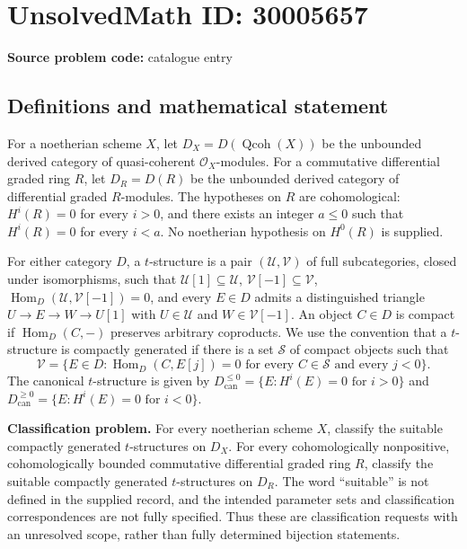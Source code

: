 \documentclass[11pt]{article}
\begin{document}
\section*{UnsolvedMath ID: 30005657}
\textbf{Source problem code:} catalogue entry
\subsection{Definitions and mathematical statement}
For a noetherian scheme \(X\), let \(D_X=D(\operatorname{Qcoh}(X))\) be the unbounded derived category of quasi-coherent \(\mathcal O_X\)-modules. For a commutative differential graded ring \(R\), let \(D_R=D(R)\) be the unbounded derived category of differential graded \(R\)-modules. The hypotheses on \(R\) are cohomological: \(H^i(R)=0\) for every \(i>0\), and there exists an integer \(a\leq 0\) such that \(H^i(R)=0\) for every \(i<a\). No noetherian hypothesis on \(H^0(R)\) is supplied.

For either category \(D\), a \(t\)-structure is a pair \((\mathcal U,\mathcal V)\) of full subcategories, closed under isomorphisms, such that \(\mathcal U[1]\subseteq\mathcal U\), \(\mathcal V[-1]\subseteq\mathcal V\), \(\operatorname{Hom}_D(\mathcal U,\mathcal V[-1])=0\), and every \(E\in D\) admits a distinguished triangle \(U\longrightarrow E\longrightarrow W\longrightarrow U[1]\) with \(U\in\mathcal U\) and \(W\in\mathcal V[-1]\). An object \(C\in D\) is compact if \(\operatorname{Hom}_D(C,-)\) preserves arbitrary coproducts. We use the convention that a \(t\)-structure is compactly generated if there is a set \(\mathcal S\) of compact objects such that
\[
\mathcal V=\{E\in D:\operatorname{Hom}_D(C,E[j])=0\text{ for every }C\in\mathcal S\text{ and every }j<0\}.
\]
The canonical \(t\)-structure is given by \(D_{\mathrm{can}}^{\leq 0}=\{E:H^i(E)=0\text{ for }i>0\}\) and \(D_{\mathrm{can}}^{\geq 0}=\{E:H^i(E)=0\text{ for }i<0\}\).

\textbf{Classification problem.} For every noetherian scheme \(X\), classify the suitable compactly generated \(t\)-structures on \(D_X\). For every cohomologically nonpositive, cohomologically bounded commutative differential graded ring \(R\), classify the suitable compactly generated \(t\)-structures on \(D_R\). The word ``suitable'' is not defined in the supplied record, and the intended parameter sets and classification correspondences are not fully specified. Thus these are classification requests with an unresolved scope, rather than fully determined bijection statements.
\end{document}
